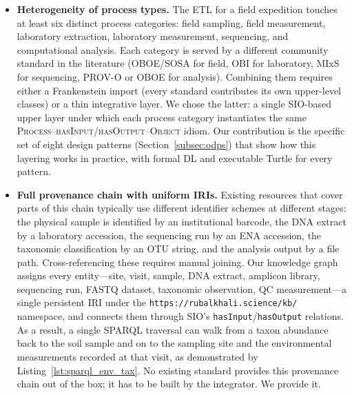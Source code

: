 \documentclass[11pt,a4paper]{article}
\begin{document}
\begin{itemize}

  \item \textbf{Heterogeneity of process types.} The ETL for a field
    expedition touches at least six distinct process categories:
    field sampling, field measurement, laboratory extraction,
    laboratory measurement, sequencing, and computational analysis.
    Each category is served by a different community standard in
    the literature (OBOE/SOSA for field, OBI for laboratory, MIxS
    for sequencing, PROV-O or OBOE for analysis). Combining them
    requires either a Frankenstein import (every standard contributes
    its own upper-level classes) or a thin integrative layer. We
    chose the latter: a single SIO-based upper layer under which each
    process category instantiates the same
    \textsc{Process--hasInput/hasOutput--Object} idiom. Our
    contribution is the specific set of eight design patterns
    (Section~\ref{subsec:odps}) that show how this layering works in
    practice, with formal DL and executable Turtle for every pattern.

  \item \textbf{Full provenance chain with uniform IRIs.} Existing
    resources that cover parts of this chain typically use different
    identifier schemes at different stages: the physical sample is
    identified by an institutional barcode, the DNA extract by a
    laboratory accession, the sequencing run by an ENA accession,
    the taxonomic classification by an OTU string, and the analysis
    output by a file path. Cross-referencing these requires manual
    joining. Our knowledge graph assigns every entity---site, visit,
    sample, DNA extract, amplicon library, sequencing run, FASTQ
    dataset, taxonomic observation, QC measurement---a single
    persistent IRI under the \texttt{https://rubalkhali.science/kb/}
    namespace, and connects them through SIO's
    \texttt{hasInput}/\texttt{hasOutput} relations. As a result, a
    single SPARQL traversal can walk from a taxon abundance back to
    the soil sample and on to the sampling site and the environmental
    measurements recorded at that visit, as demonstrated by
    Listing~\ref{lst:sparql_env_tax}. No existing standard provides
    this provenance chain out of the box; it has to be built by the
    integrator. We provide it.


\end{itemize}
\end{document}
